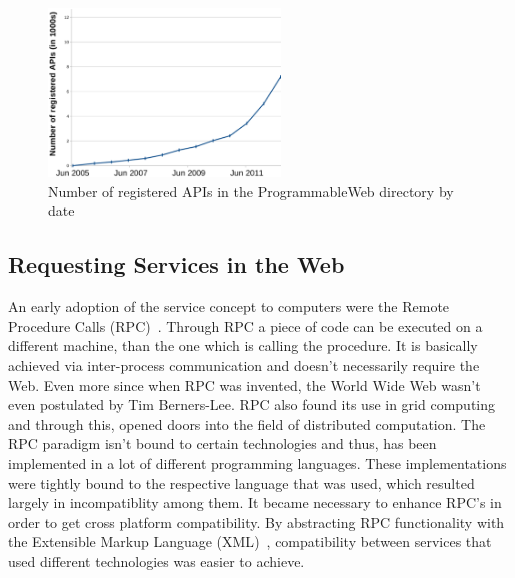 \begin{figure}[!ht]
  \centering
  \includegraphics[width=0.55\textwidth]{figures/NumOfAPIs}
  \caption{Number of registered APIs in the ProgrammableWeb directory by date}
  \label{fig:NumOfAPIs}
\end{figure}


\subsection{Requesting Services in the Web}
An early adoption of the service concept to computers were the Remote Procedure Calls (\textrm{RPC})~\cite{Birrell:1984:IRP:2080.357392}.
Through \textrm{RPC} a piece of code can be executed on a different machine, than the one which is calling the procedure.
It is basically achieved via inter-process communication and doesn't necessarily require the Web.
Even more since when \textrm{RPC} was invented, the \textrm{World Wide Web} wasn't even postulated by Tim Berners-Lee. 
\textrm{RPC} also found its use in grid computing~\cite{seymour2002overview} and through this, opened doors into the field of distributed computation.
The \textrm{RPC} paradigm isn't bound to certain technologies and thus, has been implemented in a lot of different programming languages.
These implementations were tightly bound to the respective language that was used, which resulted largely in incompatiblity among them.
It became necessary to enhance \textrm{RPC}'s in order to get cross platform compatibility.
By abstracting \textrm{RPC} functionality with the Extensible Markup Language (\textrm{XML})~\cite{bray1998extensible}, compatibility between services that used different technologies was easier to achieve.

